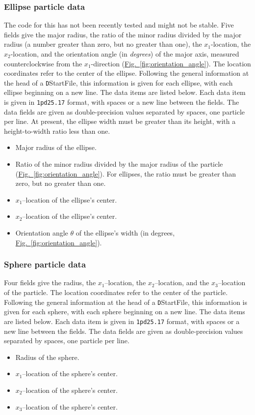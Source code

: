 \documentclass[letterpaper,11pt]{article}
\begin{document}
\subsubsection{Ellipse particle data}\label{sec:ellipse_data}
The code for this has not been recently tested
and might not be stable.
Five fields give the major radius, the ratio of the minor radius
divided by the major radius (a number greater than zero, but
no greater than one),
the $x_{1}$-location, the $x_{2}$-location, and the orientation
angle (in \emph{degrees}) of the major axis, measured counterclockwise
from the $x_{1}$-direction
(\hyperref[fig:orientation_angle]{Fig.~\ref*{fig:orientation_angle}}).
The location coordinates refer to the center of the ellipse.
Following the general information at the head of a
\texttt{D}\textsf{StartFile}, this
information is given for each ellipse,
with each ellipse beginning on a new line.
The data items are listed below.
Each data item is given in \texttt{1pd25.17} format, with
spaces or a new line between the fields.
The data fields are given as double-precision values
separated by spaces, one particle per line.
At present, the ellipse width must be greater than its height, with
a height-to-width ratio less than one.
%
\begin{itemize}
\item
Major radius of the ellipse.
\item
Ratio of the minor radius divided by the major radius of the particle
(\hyperref[fig:orientation_angle]{Fig.~\ref*{fig:orientation_angle}}).
For ellipses, the ratio must be greater than zero, but no greater than one.
\item
$x_{1}$--location of the ellipse's center.
\item
$x_{2}$--location of the ellipse's center.
\item
Orientation angle $\theta$ of the ellipse's width (in degrees, \hyperref[fig:orientation_angle]{Fig.~\ref*{fig:orientation_angle}}).
\end{itemize}
%
\subsubsection{Sphere particle data}\label{sec:sphere_data}
Four fields give the radius,
the $x_{1}$--location, the $x_{2}$--location, and the $x_{3}$--location 
of the particle.
The location coordinates refer to the center of the particle.
Following the general information at the head of a
\texttt{D}\textsf{StartFile}, this
information is given for each sphere,
with each sphere beginning on a new line.
The data items are listed below.
Each data item is given in \texttt{1pd25.17} format, with
spaces or a new line between the fields.
The data fields are given as double-precision values
separated by spaces, one particle per line.
%
\begin{itemize}
\item
Radius of the sphere.
\item
$x_{1}$--location of the sphere's center.
\item
$x_{2}$--location of the sphere's center.
\item
$x_{3}$--location of the sphere's center.
\end{itemize}
%
\end{document}
